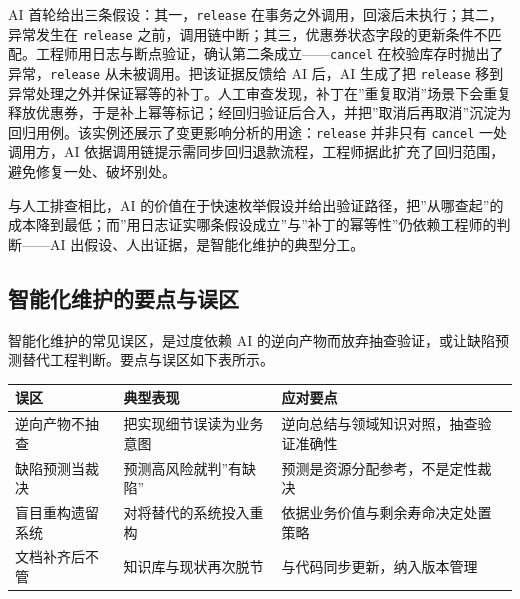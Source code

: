 \documentclass[12pt,a4paper,twoside,openany]{ctexbook}
\numberwithin{figure}{chapter}
\numberwithin{table}{chapter}
\newcounter{none}
\begin{document}
AI 首轮给出三条假设：其一，\texttt{release}
在事务之外调用，回滚后未执行；其二，异常发生在 \texttt{release}
之前，调用链中断；其三，优惠券状态字段的更新条件不匹配。工程师用日志与断点验证，确认第二条成立------\texttt{cancel}
在校验库存时抛出了异常，\texttt{release} 从未被调用。把该证据反馈给 AI
后，AI 生成了把 \texttt{release}
移到异常处理之外并保证幂等的补丁。人工审查发现，补丁在''重复取消''场景下会重复释放优惠券，于是补上幂等标记；经回归验证后合入，并把''取消后再取消''沉淀为回归用例。该实例还展示了变更影响分析的用途：\texttt{release}
并非只有 \texttt{cancel} 一处调用方，AI
依据调用链提示需同步回归退款流程，工程师据此扩充了回归范围，避免修复一处、破坏别处。

与人工排查相比，AI
的价值在于快速枚举假设并给出验证路径，把''从哪查起''的成本降到最低；而''用日志证实哪条假设成立''与''补丁的幂等性''仍依赖工程师的判断------AI
出假设、人出证据，是智能化维护的典型分工。

\subsection{智能化维护的要点与误区}\label{ux667aux80fdux5316ux7ef4ux62a4ux7684ux8981ux70b9ux4e0eux8befux533a}

智能化维护的常见误区，是过度依赖 AI
的逆向产物而放弃抽查验证，或让缺陷预测替代工程判断。要点与误区如下表所示。

{\def\LTcaptype{none} %
\begin{longtable}[]{@{}
  >{\raggedright\arraybackslash}p{}
  >{\raggedright\arraybackslash}p{}
  >{\raggedright\arraybackslash}p{}@{}}
\toprule\noalign{}
\begin{minipage}[b]{\linewidth}\raggedright
误区
\end{minipage} & \begin{minipage}[b]{\linewidth}\raggedright
典型表现
\end{minipage} & \begin{minipage}[b]{\linewidth}\raggedright
应对要点
\end{minipage} \\
\midrule\noalign{}
\endhead
\bottomrule\noalign{}
\endlastfoot
逆向产物不抽查 & 把实现细节误读为业务意图 &
逆向总结与领域知识对照，抽查验证准确性 \\
缺陷预测当裁决 & 预测高风险就判''有缺陷'' &
预测是资源分配参考，不是定性裁决 \\
盲目重构遗留系统 & 对将替代的系统投入重构 &
依据业务价值与剩余寿命决定处置策略 \\
文档补齐后不管 & 知识库与现状再次脱节 & 与代码同步更新，纳入版本管理 \\
\end{longtable}
}
\end{document}
